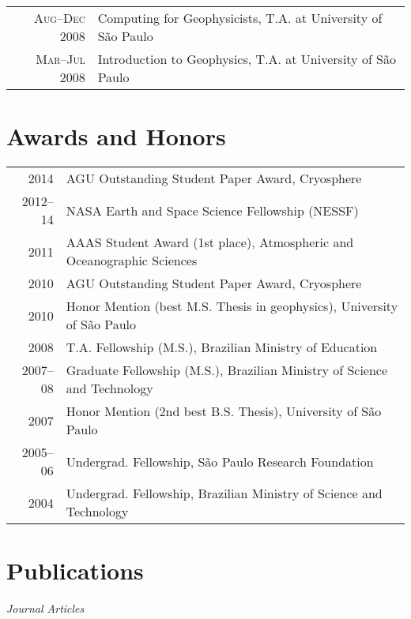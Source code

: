 \documentclass[a4paper,11pt]{article}
\begin{document}
\begin{tabular}{rl}
\textsc{Aug--Dec} 2008 & Computing for Geophysicists, T.A. at University of S\~ao Paulo\\
\textsc{Mar--Jul} 2008 & Introduction to Geophysics, T.A. at University of S\~ao Paulo
\end{tabular}


\section{Awards and Honors}

\begin{tabular}{rl}
2014 & AGU Outstanding Student Paper Award, Cryosphere\\
2012--14 & NASA Earth and Space Science Fellowship (NESSF)\\ 
2011 & AAAS Student Award (1st place), Atmospheric and Oceanographic Sciences\\
2010 & AGU Outstanding Student Paper Award, Cryosphere\\
2010 & Honor Mention (best M.S. Thesis in geophysics), University of S\~ao Paulo\\
2008 & T.A. Fellowship (M.S.), Brazilian Ministry of Education\\
2007--08 & Graduate Fellowship (M.S.), Brazilian Ministry of Science and Technology\\
2007 & Honor Mention (2nd best B.S. Thesis), University of S\~ao Paulo\\
2005--06 & Undergrad. Fellowship, S\~ao Paulo Research Foundation\\
2004 & Undergrad. Fellowship, Brazilian Ministry of Science and Technology
\end{tabular}


\section{Publications}

\emph{Journal Articles}
\end{document}
